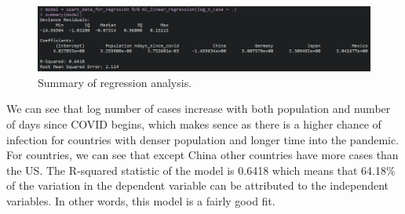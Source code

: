 \documentclass[
]{article}
\newenvironment{Shaded}{\begin{snugshade}}{\end{snugshade}}
\newcommand{\AttributeTok}[1]{\textcolor[rgb]{0.13,0.29,0.53}{#1}}
\newcommand{\ConstantTok}[1]{\textcolor[rgb]{0.56,0.35,0.01}{#1}}
\newcommand{\FunctionTok}[1]{\textcolor[rgb]{0.13,0.29,0.53}{\textbf{#1}}}
\newcommand{\NormalTok}[1]{#1}
\newcommand{\OtherTok}[1]{\textcolor[rgb]{0.56,0.35,0.01}{#1}}
\newcommand{\SpecialCharTok}[1]{\textcolor[rgb]{0.81,0.36,0.00}{\textbf{#1}}}
\newcommand{\StringTok}[1]{\textcolor[rgb]{0.31,0.60,0.02}{#1}}
\begin{document}
\begin{Shaded}
\end{Shaded}

\begin{figure}
\centering
\includegraphics{./ml_regression_summary.JPG}
\caption{Summary of regression analysis.}
\end{figure}

We can see that log number of cases increase with both population and
number of days since COVID begins, which makes sence as there is a
higher chance of infection for countries with denser population and
longer time into the pandemic. For countries, we can see that except
China other countries have more cases than the US. The R-squared
statistic of the model is 0.6418 which means that 64.18\% of the
variation in the dependent variable can be attributed to the independent
variables. In other words, this model is a fairly good fit.
\end{document}
